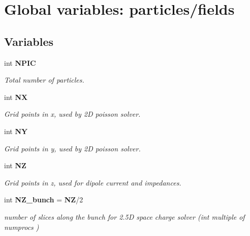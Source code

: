 \section{Global variables: particles/fields}
\label{group__Part}
\subsection*{Variables}
\begin{CompactItemize}
\item 
int {\bf NPIC}\label{group__Part_ga0}

\begin{CompactList}\small\item\em Total number of particles. \item\end{CompactList}\item 
int {\bf NX}\label{group__Part_ga1}

\begin{CompactList}\small\item\em Grid points in x, used by 2D poisson solver. \item\end{CompactList}\item 
int {\bf NY}\label{group__Part_ga2}

\begin{CompactList}\small\item\em Grid points in y, used by 2D poisson solver. \item\end{CompactList}\item 
int {\bf NZ}\label{group__Part_ga3}

\begin{CompactList}\small\item\em Grid points in z, used for dipole current and impedances. \item\end{CompactList}\item 
int {\bf NZ\_\-bunch} = {\bf NZ}/2\label{group__Part_ga4}

\begin{CompactList}\small\item\em number of slices along the bunch for 2.5D space charge solver (int multiple of numprocs ) \item\end{CompactList}\end{CompactItemize}
